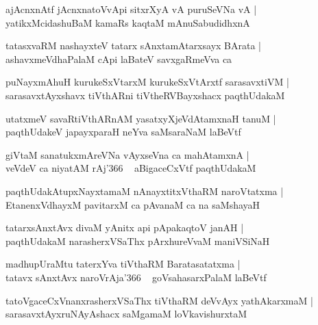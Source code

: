 \documentclass[twoside,12pt,openright]{book}
\newcounter{shloka}[chapter]
\begin{document}
\begin{shloka}
ajAcnxnAtf jAcnxnatoVvApi sitxrXyA vA puruSeVNa vA |\\
yatikxMcidashuBaM kamaRs kaqtaM mAnuSabudidhxnA
\end{shloka}

\begin{shloka}
tatasxvaRM nashayxteV tatarx sAnxtamAtarxsayx BArata |\\
ashavxmeVdhaPalaM cApi laBateV savxgaRmeVva ca  
\end{shloka}

\begin{shloka}
puNayxmAhuH kurukeSxVtarxM kurukeSxVtArxtf sarasavxtiVM |\\
sarasavxtAyxshavx tiVthARni tiVtheRVBayxshacx paqthUdakaM 
\end{shloka}

\begin{shloka}
utatxmeV savaRtiVthARnAM yasatxyXjeVdAtamxnaH tanuM |\\
paqthUdakeV japayxparaH neYva saMsaraNaM laBeVtf 
\end{shloka}

\begin{shloka}
giVtaM sanatukxmAreVNa vAyxseVna  ca mahAtamxnA |\\
veVdeV ca niyatAM rAj\char'366 ~ aBigaceCxVtf paqthUdakaM 
\end{shloka}

\begin{shloka}
paqthUdakAtupxNayxtamaM nAnayxtitxVthaRM naroVtatxma |\\
EtanenxVdhayxM pavitarxM ca pAvanaM ca na saMshayaH 
\end{shloka}

\begin{shloka}
tatarxsAnxtAvx divaM yAnitx api pApakaqtoV janAH |\\
paqthUdakaM narasherxVSaThx pArxhureVvaM maniVSiNaH 
\end{shloka}

\begin{shloka}
madhupUraMtu taterxYva tiVthaRM Baratasatatxma |\\
tatavx sAnxtAvx naroVrAja\char'366 ~ goVsahasarxPalaM laBeVtf
\end{shloka}

\begin{shloka}
tatoVgaceCxVnanxrasherxVSaThx tiVthaRM deVvAyx yathAkarxmaM |\\
sarasavxtAyxruNAyAshacx saMgamaM loVkavishurxtaM 
\end{shloka}
\end{document}
